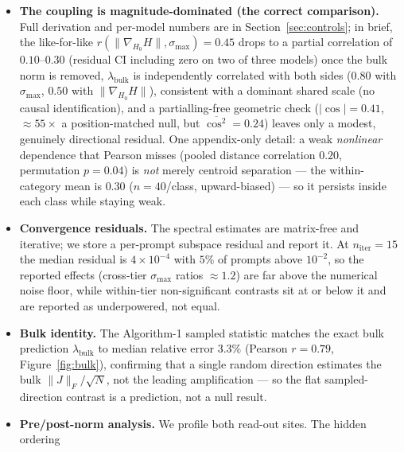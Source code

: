 \documentclass{article}
\begin{document}
\begin{itemize}
  ordering collapses from $d=-0.98$ to $-0.19$ after conditioning on entropy; Figure~\ref{fig:confound}),
  so we report $\chi_F$ as an output-side, entropy-related measure and do \emph{not} treat it as a
  second independent axis. This is consistent with the $\chi_F$ analytic skeleton of
  Section~\ref{sec:results-alg2} ($\chi_F^{\max}\le\tfrac12\lambda_{\max}(F)\,\sigma_{\max}(J_z)^2$,
  with $\lambda_{\max}(F)\to0$ at both entropy extremes).
  \item \textbf{The coupling is magnitude-dominated (the correct comparison).} Full derivation and
  per-model numbers are in Section~\ref{sec:controls}; in brief, the like-for-like
  $r(\|\nabla_{H_0}H\|,\sigma_{\max})=0.45$ drops to a partial correlation of $0.10$--$0.30$ (residual
  CI including zero on two of three models) once the bulk norm is removed, $\lambda_{\mathrm{bulk}}$
  is independently correlated with both sides ($0.80$ with $\sigma_{\max}$, $0.50$ with $\|\nabla_{H_0}H\|$),
  consistent with a dominant shared scale (no causal identification), and a partialling-free geometric check ($|\!\cos|=0.41$, $\approx\!55\times$
  a position-matched null, but $\overline{\cos^2}=0.24$) leaves only a modest, genuinely directional
  residual. One appendix-only detail: a weak \emph{nonlinear} dependence that Pearson misses (pooled
  distance correlation $0.20$, permutation $p=0.04$) is \emph{not} merely centroid separation --- the
  within-category mean is $0.30$ ($n=40$/class, upward-biased) --- so it persists inside each class
  while staying weak.
  \item \textbf{Convergence residuals.} The spectral estimates are matrix-free and iterative; we
  store a per-prompt subspace residual and report it. At $n_{\mathrm{iter}}=15$ the median residual
  is $4\times10^{-4}$ with $5\%$ of prompts above $10^{-2}$, so the reported effects (cross-tier
  $\sigma_{\max}$ ratios $\approx1.2$) are far above the numerical noise floor, while within-tier
  non-significant contrasts sit at or below it and are reported as underpowered, not equal.
  \item \textbf{Bulk identity.} The Algorithm-1 sampled statistic matches the exact bulk
  prediction $\lambda_{\mathrm{bulk}}$ to median relative error $3.3\%$ (Pearson $r=0.79$,
  Figure~\ref{fig:bulk}), confirming that a single random direction estimates the bulk
  $\|J\|_F/\sqrt N$, not the leading amplification --- so the flat sampled-direction contrast is a
  prediction, not a null result.
  \item \textbf{Pre/post-norm analysis.} We profile both read-out sites. The hidden ordering

\end{itemize}
\end{document}
